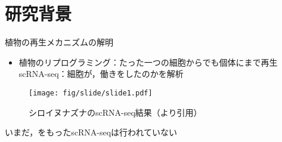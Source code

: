 \section{研究背景}

\begin{frame}{植物の再生メカニズムの解明}
    \begin{itemize}
        \item 植物のリプログラミング：たった一つの細胞からでも個体にまで再生
        \\\ra scRNA-seq：細胞が，働きをしたのかを解析
    \end{itemize}
    \begin{figure}
        \centering
        \texttt{[image: fig/slide/slide1.pdf]}
        \caption{シロイヌナズナのscRNA-seq結果（\cite{shahan2022single}より引用）}
    \end{figure}
    \Ra いまだ，をもったscRNA-seqは行われていない
\end{frame}

